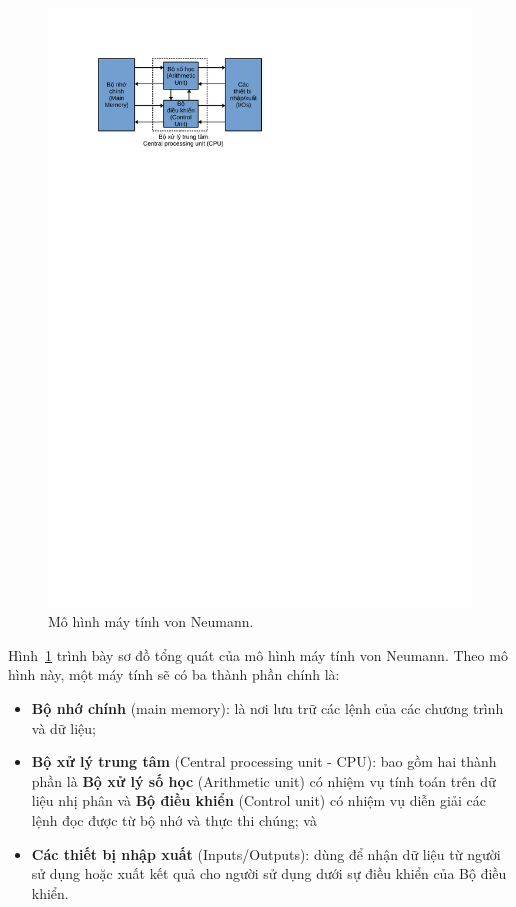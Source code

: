 \begin{figure}[h]
	\centering
		\includegraphics[width=0.7\columnwidth]{chapter01/figure/vonNeumann.pdf}
		\centering
	\caption{Mô hình máy tính von Neumann.}
	\label{fig:vonNeumann}
\end{figure}

Hình~\ref{fig:vonNeumann} trình bày sơ đồ tổng quát của mô hình máy tính von Neumann. Theo mô hình này, một máy tính sẽ có ba thành phần chính là:
\begin{itemize}
	\item \textbf{Bộ nhớ chính} (main memory): là nơi lưu trữ các lệnh của các chương trình và dữ liệu;
	\item \textbf{Bộ xử lý trung tâm} (Central processing unit - CPU): bao gồm hai thành phần là \textbf{Bộ xử lý số học} (Arithmetic unit) có nhiệm vụ tính toán trên dữ liệu nhị phân và \textbf{Bộ điều khiển} (Control unit) có nhiệm vụ diễn giải các lệnh đọc được từ bộ nhớ và thực thi chúng; và
	\item \textbf{Các thiết bị nhập xuất} (Inputs/Outputs): dùng để nhận dữ liệu từ người sử dụng hoặc xuất kết quả cho người sử dụng dưới sự điều khiển của Bộ điều khiển.
\end{itemize}

